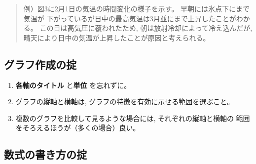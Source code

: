 \documentclass[12pt, ]{jsarticle}
\providecommand{\tightlist}{%
   \setlength{\itemsep}{0pt}\setlength{\parskip}{0pt}}
\begin{document}
\begin{enumerate}
  \begin{quote}
  例）図3に2月1日の気温の時間変化の様子を示す。
  早朝には氷点下にまで気温が
  下がっているが日中の最高気温は3月並にまで上昇したことがわかる。
  この日は高気圧に覆われたため, 朝は放射冷却によって冷え込んだが,
  晴天により日中の気温が上昇したことが原因と考えられる。
  \end{quote}
\end{enumerate}

\subsection{グラフ作成の掟}\label{ux30b0ux30e9ux30d5ux4f5cux6210ux306eux639f}

\begin{enumerate}
\tightlist
\item
  \textbf{各軸のタイトル} と\textbf{単位} を忘れずに。
\item
  グラフの縦軸と横軸は, グラフの特徴を有効に示せる範囲を選ぶこと。
\item
  複数のグラフを比較して見るような場合には, それぞれの縦軸と横軸の
  範囲をそろえるほうが（多くの場合）良い。
\end{enumerate}

\subsection{数式の書き方の掟}\label{ux6570ux5f0fux306eux66f8ux304dux65b9ux306eux639f}
\end{document}

